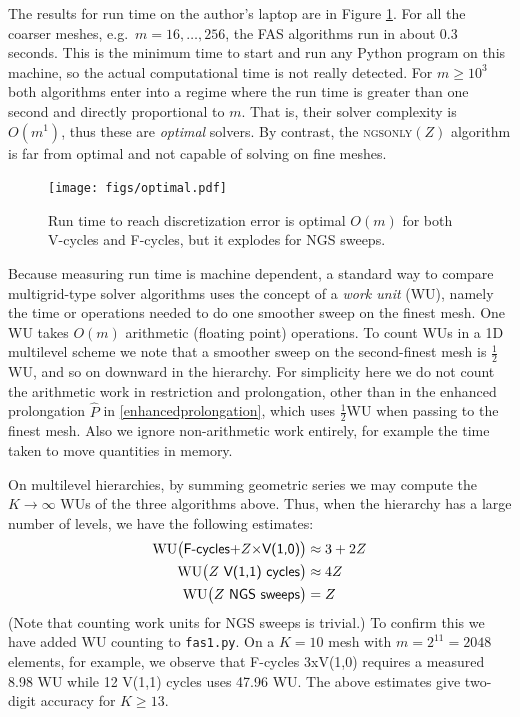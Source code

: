 \documentclass[letterpaper,final,12pt,reqno]{amsart}
\begin{document}
The results for run time on the author's laptop are in Figure \ref{fig:optimal}.  For all the coarser meshes, e.g.~$m=16,\dots,256$, the FAS algorithms run in about 0.3 seconds.  This is the minimum time to start and run any Python program on this machine, so the actual computational time is not really detected.  For $m \ge 10^3$ both algorithms enter into a regime where the run time is greater than one second and directly proportional to $m$.  That is, their solver complexity is $O(m^1)$, thus these are \emph{optimal} \cite[Chapter 7]{Bueler2021} solvers.  By contrast, the \textsc{ngsonly}$(Z)$ algorithm is far from optimal and not capable of solving on fine meshes.

\begin{figure}
\texttt{[image: figs/optimal.pdf]}
\caption{Run time to reach discretization error is optimal $O(m)$ for both V-cycles and F-cycles, but it explodes for NGS sweeps.}
\label{fig:optimal}
\end{figure}

Because measuring run time is machine dependent, a standard way to compare multigrid-type solver algorithms uses the concept of a \emph{work unit} (WU), namely the time or operations needed to do one smoother sweep on the finest mesh.  One WU takes $O(m)$ arithmetic (floating point) operations.  To count WUs in a 1D multilevel scheme we note that a smoother sweep on the second-finest mesh is $\frac{1}{2}$WU, and so on downward in the hierarchy.  For simplicity here we do not count the arithmetic work in restriction and prolongation, other than in the enhanced prolongation $\hat P$ in \eqref{enhancedprolongation}, which uses $\frac{1}{2}$WU when passing to the finest mesh.  Also we ignore non-arithmetic work entirely, for example the time taken to move quantities in memory.

On multilevel hierarchies, by summing geometric series \cite{Briggsetal2000} we may compute the $K\to\infty$ WUs of the three algorithms above.  Thus, when the hierarchy has a large number of levels, we have the following estimates:
\begin{align*}
\text{WU}\big(\text{\textsf{F-cycles$+Z\times$V(1,0)}}\big) &\approx 3+2Z \\
\text{WU}\big(\text{\textsf{$Z$ V(1,1) cycles}}\big)   &\approx 4Z \\
\text{WU}\big(\text{\textsf{$Z$ NGS sweeps}}\big)      &= Z
\end{align*}
(Note that counting work units for NGS sweeps is trivial.)  To confirm this we have added WU counting to \texttt{fas1.py}.  On a $K=10$ mesh with $m=2^{11}=2048$ elements, for example, we observe that \textsf{F-cycles 3xV(1,0)} requires a measured 8.98 WU while \textsf{12 V(1,1) cycles} uses 47.96 WU.  The above estimates give two-digit accuracy for $K \ge 13$.
\end{document}
